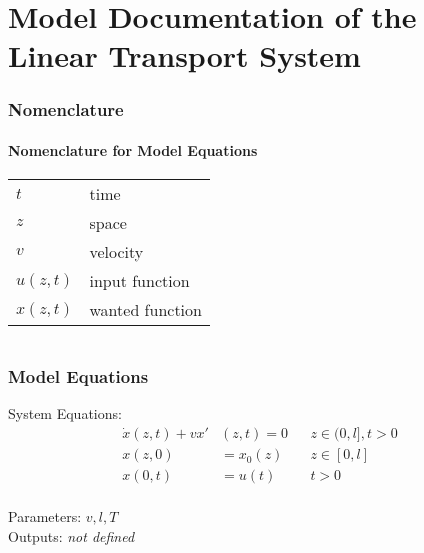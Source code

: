 \documentclass[10pt,a4paper]{article}
\begin{document}
	\part*{Model Documentation of the Linear Transport System} %
	
	
	\section{Nomenclature} %
	\subsection{Nomenclature for Model Equations} %
	
	\begin{tabular}{ll}
		$t$ & time \\
		$z$ & space \\
		$v$ & velocity \\
		$u(z, t)$ & input function \\
		$x(z, t)$ & wanted function
				
	\end{tabular}
	 
	
	\begin{tabular}{ll}

	\end{tabular}
	
	
	\section{Model Equations} %
	
	\noindent System Equations:			
	\begin{subequations}
	\begin{align}
		\dot{x}(z,t) + v x'&(z,t) = 0 && z\in (0, l], t>0\\
		x(z,0) &= x_0(z) && z\in [0,l]\\
		x(0,t) &= u(t) && t>0\\
	\end{align}
	\end{subequations}

	\noindent
	Parameters: $v, l, T$ %
	\\
	Outputs: \textit{\textlangle not defined\textrangle} %
	
\end{document}
